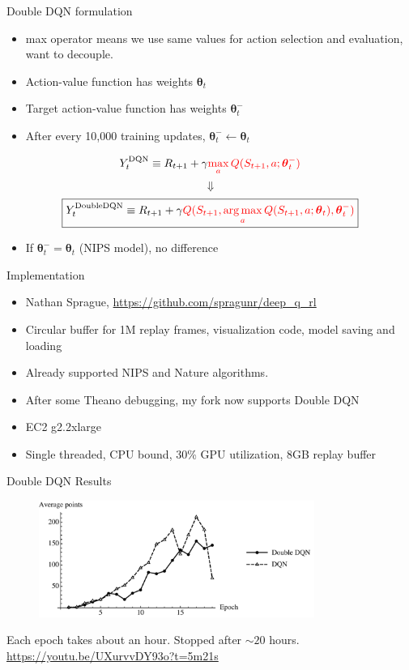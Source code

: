 \documentclass{beamer}
\DeclareMathOperator*{\argmax}{arg\,max}
\begin{document}
\begin{frame}{Double DQN formulation}
  \begin{itemize}
    \item max operator means we use same values for action selection and evaluation, want to decouple.
    \item Action-value function has weights $\boldsymbol{\theta}_t$
    \item Target action-value function has weights $\boldsymbol{\theta}_t^-$
    \item After every 10,000 training updates, $\boldsymbol{\theta}_t^- \leftarrow \boldsymbol{\theta}_t$
  \end{itemize}

  \[Y_t^{\textrm{DQN}} \equiv R_{t+1} + \gamma \textcolor{red}{\max_{a} Q(S_{t+1},a;\boldsymbol{\theta}_t^-)} \]
  \[ \Downarrow \]
  \[\boxed{Y_t^{\textrm{DoubleDQN}} \equiv R_{t+1} + \gamma \textcolor{red}{Q(S_{t+1},\argmax_a Q(S_{t+1},a;\boldsymbol{\theta}_t),\boldsymbol{\theta}_t^-)}} \]
  \begin{itemize}
    \item If $\boldsymbol{\theta}_t^- = \boldsymbol{\theta}_t$ (NIPS model), no difference
  \end{itemize}
\end{frame}

\begin{frame}{Implementation}
  \begin{itemize}
    \item Nathan Sprague, \href{https://github.com/spragunr/deep_q_rl}{https://github.com/spragunr/deep\_q\_rl}
    \item Circular buffer for 1M replay frames, visualization code, model saving and loading
    \item Already supported NIPS and Nature algorithms.
    \item After some Theano debugging, my fork now supports Double DQN
    \item EC2 g2.2xlarge
    \item Single threaded, CPU bound, 30\% GPU utilization, 8GB replay buffer
  \end{itemize}
\end{frame}

\begin{frame}{Double DQN Results}
  \begin{figure}[H]
    \centering
    \includegraphics[width=90mm]{dqn_rewardper.pdf}
  \end{figure}
  Each epoch takes about an hour. Stopped after $\sim 20$ hours.\\
  \vspace{12pt}
  \url{https://youtu.be/UXurvvDY93o?t=5m21s}
\end{frame}
\end{document}
